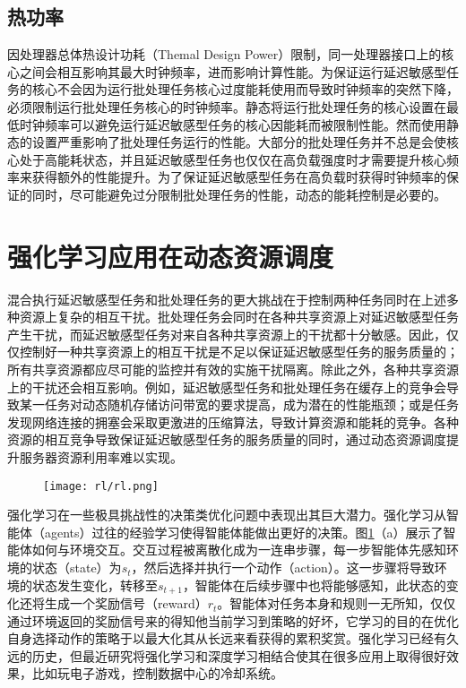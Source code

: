 \subsection{热功率}
因处理器总体热设计功耗（Themal Design Power）限制，同一处理器接口上的核心之间会相互影响其最大时钟频率，进而影响计算性能。为保证运行延迟敏感型任务的核心不会因为运行批处理任务核心过度能耗使用而导致时钟频率的突然下降，必须限制运行批处理任务核心的时钟频率。静态将运行批处理任务的核心设置在最低时钟频率可以避免运行延迟敏感型任务的核心因能耗而被限制性能。然而使用静态的设置严重影响了批处理任务运行的性能。大部分的批处理任务并不总是会使核心处于高能耗状态，并且延迟敏感型任务也仅仅在高负载强度时才需要提升核心频率来获得额外的性能提升。为了保证延迟敏感型任务在高负载时获得时钟频率的保证的同时，尽可能避免过分限制批处理任务的性能，动态的能耗控制是必要的。

\section{强化学习应用在动态资源调度}
混合执行延迟敏感型任务和批处理任务的更大挑战在于控制两种任务同时在上述多种资源上复杂的相互干扰。批处理任务会同时在各种共享资源上对延迟敏感型任务产生干扰，而延迟敏感型任务对来自各种共享资源上的干扰都十分敏感。因此，仅仅控制好一种共享资源上的相互干扰是不足以保证延迟敏感型任务的服务质量的；所有共享资源都应尽可能的监控并有效的实施干扰隔离。除此之外，各种共享资源上的干扰还会相互影响。例如，延迟敏感型任务和批处理任务在缓存上的竞争会导致某一任务对动态随机存储访问带宽的要求提高，成为潜在的性能瓶颈；或是任务发现网络连接的拥塞会采取更激进的压缩算法，导致计算资源和能耗的竞争。各种资源的相互竞争导致保证延迟敏感型任务的服务质量的同时，通过动态资源调度提升服务器资源利用率难以实现。

\begin{figure}
  \centering
  \begin{minipage}[b]{0.7\textwidth}
    \centering
    \texttt{[image: rl/rl.png]}
    \label{fig:rl}
  \end{minipage}     
\end{figure}


强化学习在一些极具挑战性的决策类优化问题中表现出其巨大潜力\cite{mnih2013playing}\cite{silver2016mastering}。强化学习从智能体（agents）过往的经验学习使得智能体能做出更好的决策。图\ref{fig:rl}（a）展示了智能体如何与环境交互。交互过程被离散化成为一连串步骤，每一步智能体先感知环境的状态（state）为$s_t$，然后选择并执行一个动作（action）。这一步骤将导致环境的状态发生变化，转移至$s_{t+1}$，智能体在后续步骤中也将能够感知，此状态的变化还将生成一个奖励信号（reward）$r_t$。智能体对任务本身和规则一无所知，仅仅通过环境返回的奖励信号来的得知他当前学习到策略的好坏\cite{bertsekas1995dynamic}，它学习的目的在优化自身选择动作的策略于以最大化其从长远来看获得的累积奖赏。强化学习已经有久远的历史，但最近研究将强化学习和深度学习相结合使其在很多应用上取得很好效果，比如玩电子游戏\cite{mnih2015human}，控制数据中心的冷却系统\cite{evans2016deepmind}。

